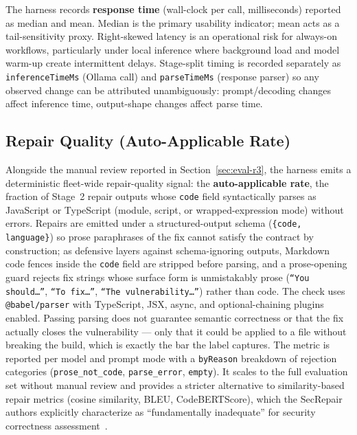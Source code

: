 The harness records \textbf{response time} (wall-clock per call, milliseconds) reported as median and mean. Median is the primary usability indicator; mean acts as a tail-sensitivity proxy. Right-skewed latency is an operational risk for always-on workflows, particularly under local inference where background load and model warm-up create intermittent delays. Stage-split timing is recorded separately as \texttt{inferenceTimeMs} (Ollama call) and \texttt{parseTimeMs} (response parser) so any observed change can be attributed unambiguously: prompt/decoding changes affect inference time, output-shape changes affect parse time.

\subsection{Repair Quality (Auto-Applicable Rate)}
\label{subsec:eval-metrics-repair}

Alongside the manual review reported in Section~\ref{sec:eval-r3}, the harness emits a deterministic fleet-wide repair-quality signal: the \textbf{auto-applicable rate}, the fraction of Stage~2 repair outputs whose \texttt{code} field syntactically parses as JavaScript or TypeScript (module, script, or wrapped-expression mode) without errors. Repairs are emitted under a structured-output schema (\texttt{\{code, language\}}) so prose paraphrases of the fix cannot satisfy the contract by construction; as defensive layers against schema-ignoring outputs, Markdown code fences inside the \texttt{code} field are stripped before parsing, and a prose-opening guard rejects fix strings whose surface form is unmistakably prose (\texttt{``You should\dots''}, \texttt{``To fix\dots''}, \texttt{``The vulnerability\dots''}) rather than code. The check uses \texttt{@babel/parser} with TypeScript, JSX, async, and optional-chaining plugins enabled. Passing parsing does not guarantee semantic correctness or that the fix actually closes the vulnerability --- only that it could be applied to a file without breaking the build, which is exactly the bar the label captures. The metric is reported per model and prompt mode with a \texttt{byReason} breakdown of rejection categories (\texttt{prose\_not\_code}, \texttt{parse\_error}, \texttt{empty}). It scales to the full evaluation set without manual review and provides a stricter alternative to similarity-based repair metrics (cosine similarity, BLEU, CodeBERTScore), which the SecRepair authors explicitly characterize as ``fundamentally inadequate'' for security correctness assessment~\cite{islam2024secrepair}.
